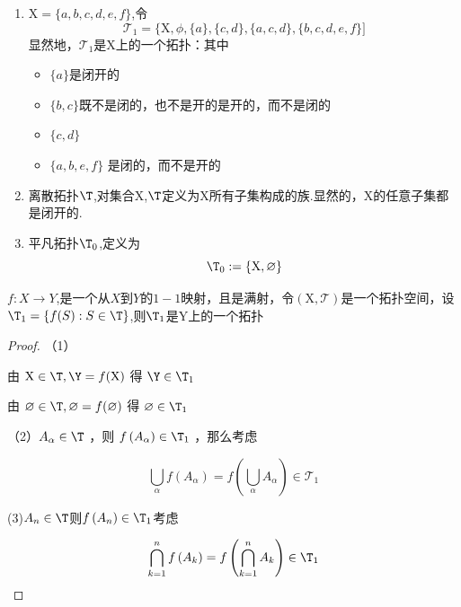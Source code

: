 \begin{example}
	\begin{enumerate}
		\item		$\mathrm{X}=  \{a, b, c, d, e, f\}$,令
		$$\mathcal{T}_1=\{\mathrm{X}, \phi,\{a\},\{c, d\},\{a, c, d\},\{b, c, d, e, f\}]$$
		显然地，$\mathcal{T}_1$是$\mathrm{X}$上的一个拓扑：其中
		\begin{itemize}
			\item $\{a\}$是闭开的
			\item$\{b,c\}$既不是闭的，也不是开的是开的，而不是闭的
			\item$\{c,d\}$
			\item$\{a, b, e, f\}$ 是闭的，而不是开的
		\end{itemize}
		\item 离散拓扑$\T$,对集合$\mathrm{X}$,$\T$定义为$\mathrm{X}$所有子集构成的族.显然的，$\mathrm{X}$的任意子集都是闭开的.
		\item 平凡拓扑$\T_0$,定义为
		\[\T_0:=\{\mathrm{X},\varnothing\}\]
	\end{enumerate}
\end{example}
\begin{theorem}
	$f:X\rightarrow Y$,是一个从$X$到$Y$的$1-1$映射，且是满射，令$\left(\mathrm{X}, \mathcal{T}\right)$是一个拓扑空间，设$\T_1=\{f(S):S\in\T\}$,则$\T_1$是$\mathrm{Y}$上的一个拓扑
\end{theorem}
\begin{proof}
	（1）
	
	由 $\mathrm{X} \in \T,  \Y=f(\mathrm{X} )$ 得 $\Y\in \T_1$
	
	由 $\varnothing \in \T,  \varnothing=f(\varnothing)$ 得 $\varnothing \in \T_1$
	
	（2）$A_\alpha \in \T$ ，则 $f\left(A_\alpha\right) \in \T_1$ ，那么考虑
	
	$$
	\bigcup_\alpha f\left(A_\alpha\right)=f\left(\bigcup_\alpha A_\alpha\right) \in \mathcal{T}_1
	$$
	
	(3)$A_n \in \T$则$f\left(A_n\right) \in \T_1$考虑
	
	$$\bigcap_{k=1}^n f\left(A_k\right)=f\left(\bigcap_{k=1}^n A_k\right) \in \T_1$$
\end{proof}
